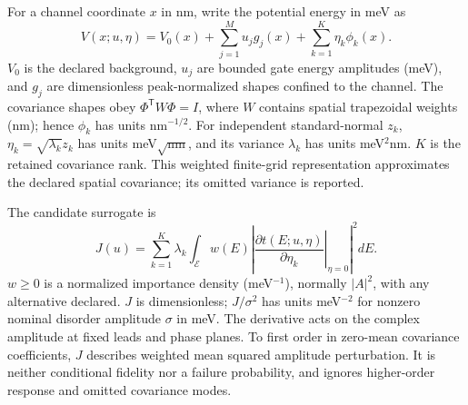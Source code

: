 For a channel coordinate $x$ in nm, write the potential energy in meV as
\[
V(x;u,\eta)=V_0(x)+\sum_{j=1}^M u_jg_j(x)+\sum_{k=1}^K\eta_k\phi_k(x).
\]
$V_0$ is the declared background, $u_j$ are bounded gate energy amplitudes (meV),
and $g_j$ are dimensionless peak-normalized shapes confined to the channel.
The covariance shapes obey $\Phi^\mathsf{T}W\Phi=I$, where $W$ contains spatial
trapezoidal weights (nm); hence $\phi_k$ has units nm$^{-1/2}$.
For independent standard-normal $z_k$, $\eta_k=\sqrt{\lambda_k}z_k$ has
units meV$\sqrt{\text{nm}}$, and its variance $\lambda_k$ has units meV$^2$nm.
$K$ is the retained covariance rank. This weighted finite-grid representation
approximates the declared spatial covariance; its omitted variance is reported.

The candidate surrogate is
\[
J(u)=\sum_{k=1}^K\lambda_k
\int_{\mathcal E}w(E)
\left|\left.\frac{\partial t(E;u,\eta)}{\partial\eta_k}\right|_{\eta=0}\right|^2dE.
\]
$w\geq0$ is a normalized importance density (meV$^{-1}$), normally $|A|^2$,
with any alternative declared. $J$ is dimensionless; $J/\sigma^2$ has units
meV$^{-2}$ for nonzero nominal disorder amplitude $\sigma$ in meV. The derivative
acts on the complex amplitude at fixed leads and phase planes. To first order
in zero-mean covariance coefficients, $J$ describes weighted mean squared
amplitude perturbation. It is neither conditional fidelity nor a failure
probability, and ignores higher-order response and omitted covariance modes.
